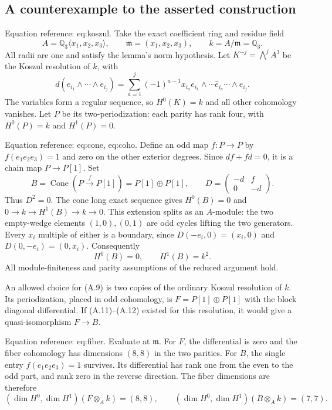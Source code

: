 \documentclass[10pt]{article}
\begin{document}
\subsection*{A counterexample to the asserted construction}
Equation reference: eq:koszul. Take the exact coefficient ring and residue field \[A=\mathbb Q_3\langle x_1,x_2,x_3\rangle,\qquad
 \mathfrak m=(x_1,x_2,x_3),\qquad k=A/\mathfrak m=\mathbb Q_3.\] All radii are one and satisfy the lemma’s norm hypothesis. Let \(K^{-j}=\bigwedge^j A^3\) be the Koszul resolution of \(k\), with \[d(e_{i_1}\wedge\cdots\wedge e_{i_j})
 =\sum_{a=1}^j(-1)^{a-1}x_{i_a}
 e_{i_1}\wedge\cdots\widehat e_{i_a}\cdots\wedge e_{i_j}.
 \] The variables form a regular sequence, so \(H^0(K)=k\) and all other cohomology vanishes. Let \(P\) be its two-periodization: each parity has rank four, with \(H^0(P)=k\) and \(H^1(P)=0\).\par
Equation reference: eq:cone, eq:coho. Define an odd map \(f:P\to P\) by \(f(e_1e_2e_3)=1\) and zero on the other exterior degrees. Since \(df+fd=0\), it is a chain map \(P\to P[1]\). Set \[B=\operatorname{Cone}(P\xrightarrow{f}P[1])
   =P[1]\oplus P[1],\qquad
 D=\begin{pmatrix}-d&f\\0&-d\end{pmatrix}.
 \] Thus \(D^2=0\). The cone long exact sequence gives \(H^0(B)=0\) and \(0\to k\to H^1(B)\to k\to0\). This extension splits as an \(A\)-module: the two empty-wedge elements \((1,0),(0,1)\) are odd cycles lifting the two generators. Every \(x_i\) multiple of either is a boundary, since \(D(-e_i,0)=(x_i,0)\) and \(D(0,-e_i)=(0,x_i)\). Consequently \[H^0(B)=0,\qquad H^1(B)=k^2.
 \] All module-finiteness and parity assumptions of the reduced argument hold.\par
An allowed choice for (A.9) is two copies of the ordinary Koszul resolution of \(k\). Its periodization, placed in odd cohomology, is \(F=P[1]\oplus P[1]\) with the block diagonal differential. If (A.11)–(A.12) existed for this resolution, it would give a quasi-isomorphism \(F\to B\).\par
Equation reference: eq:fiber. Evaluate at \(\mathfrak m\). For \(F\), the differential is zero and the fiber cohomology has dimensions \((8,8)\) in the two parities. For \(B\), the single entry \(f(e_1e_2e_3)=1\) survives. Its differential has rank one from the even to the odd part, and rank zero in the reverse direction. The fiber dimensions are therefore \[(\dim H^0,\dim H^1)(F\otimes_A k)=(8,8),\qquad
 (\dim H^0,\dim H^1)(B\otimes_A k)=(7,7).
 \]\par
\end{document}
